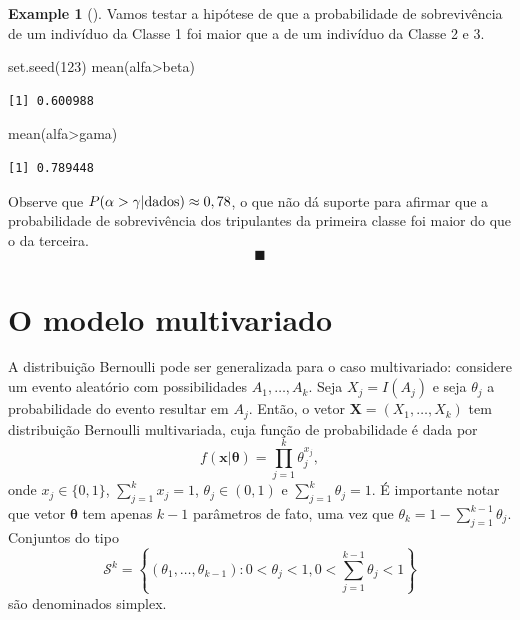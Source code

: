 \documentclass[
  letterpaper,
  DIV=11,
  numbers=noendperiod]{scrreprt}
\newenvironment{Shaded}{\begin{snugshade}}{\end{snugshade}}
\newcommand{\DecValTok}[1]{\textcolor[rgb]{0.68,0.00,0.00}{#1}}
\newcommand{\FunctionTok}[1]{\textcolor[rgb]{0.28,0.35,0.67}{#1}}
\newcommand{\NormalTok}[1]{\textcolor[rgb]{0.00,0.23,0.31}{#1}}
\newcommand{\SpecialCharTok}[1]{\textcolor[rgb]{0.37,0.37,0.37}{#1}}
\theoremstyle{plain}
\theoremstyle{definition}
\theoremstyle{definition}
\newtheorem{example}{Example}[chapter]
\theoremstyle{remark}
\begin{document}
\begin{example}[]
Vamos testar a hipótese de que a probabilidade de sobrevivência de um
indivíduo da Classe 1 foi maior que a de um indivíduo da Classe 2 e 3.

\begin{Shaded}
\begin{Highlighting}[]
\FunctionTok{set.seed}\NormalTok{(}\DecValTok{123}\NormalTok{)}
\FunctionTok{mean}\NormalTok{(alfa}\SpecialCharTok{\textgreater{}}\NormalTok{beta)}
\end{Highlighting}
\end{Shaded}

\begin{verbatim}
[1] 0.600988
\end{verbatim}

\begin{Shaded}
\begin{Highlighting}[]
\FunctionTok{mean}\NormalTok{(alfa}\SpecialCharTok{\textgreater{}}\NormalTok{gama)}
\end{Highlighting}
\end{Shaded}

\begin{verbatim}
[1] 0.789448
\end{verbatim}

Observe que \(P(\alpha>\gamma|\hbox{dados})\approx 0,78\), o que não dá
suporte para afirmar que a probabilidade de sobrevivência dos
tripulantes da primeira classe foi maior do que o da terceira.
\[\blacksquare\]

\end{example}

\section{O modelo multivariado}\label{o-modelo-multivariado}

A distribuição Bernoulli pode ser generalizada para o caso multivariado:
considere um evento aleatório com possibilidades \(A_1,\ldots,A_k\).
Seja \(X_j=I(A_j)\) e seja \(\theta_j\) a probabilidade do evento
resultar em \(A_j\). Então, o vetor \(\boldsymbol{X}=(X_1,\ldots,X_k)\)
tem distribuição Bernoulli multivariada, cuja função de probabilidade é
dada por
\[f(\boldsymbol{x}|\boldsymbol{\theta})=\prod_{j=1}^k\theta_j^{x_{j}},\]
onde \(x_j\in\{0,1\}\), \(\sum_{j=1}^kx_j=1\), \(\theta_j\in(0,1)\) e
\(\sum_{j=1}^k\theta_j=1\). É importante notar que vetor
\(\boldsymbol{\theta}\) tem apenas \(k-1\) parâmetros de fato, uma vez
que \(\theta_k=1-\sum_{j=1}^{k-1}\theta_j\). Conjuntos do tipo
\[\mathcal{S}^k=\left\{(\theta_1,\ldots,\theta_{k-1}):0<\theta_j<1,0<\sum_{j=1}^{k-1}\theta_j<1\right\}\]
são denominados simplex.
\end{document}
